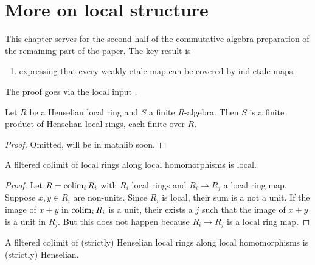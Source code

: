 \chapter{More on local structure}

This chapter serves for the second half of the commutative algebra preparation of the remaining part of the paper. The key result is
\begin{enumerate}
  \item {} expressing that every weakly etale map can be covered by ind-etale maps.
\end{enumerate}
The proof goes via the local input \label{weakly-etale-over-sh}.

\begin{lemma}
    Let $R$ be a Henselian local ring and $S$ a finite $R$-algebra. Then $S$ is
    a finite product of Henselian local rings, each finite over $R$.
    \label{lemma:finite-over-henselian-local}
    \leanok
\end{lemma}

\begin{proof}
    Omitted, will be in mathlib soon.
\end{proof}

\begin{lemma}
    A filtered colimit of local rings along local homomorphisms is local.
    \label{lemma:colimit-local}
    \leanok
\end{lemma}

\begin{proof}
    \leanok
    Let $R = \operatorname{colim}_i R_i$ with $R_i$ local rings and $R_i \to R_j$ a local ring map.
    Suppose $x, y \in R_i$ are non-units. Since $R_i$ is local, their sum is a not a unit.
    If the image of $x + y$ in $\operatorname{colim}_i R_i$ is a unit, their exists a $j$ such that the image of $x + y$ is a
    unit in $R_j$. But this does not happen because $R_i \to R_j$ is a local ring map.
\end{proof}

\begin{lemma}
    A filtered colimit of (strictly) Henselian local rings along local homomorphisms is
    (strictly) Henselian.
    \label{lemma:colimit-henselian-local}
\end{lemma}

